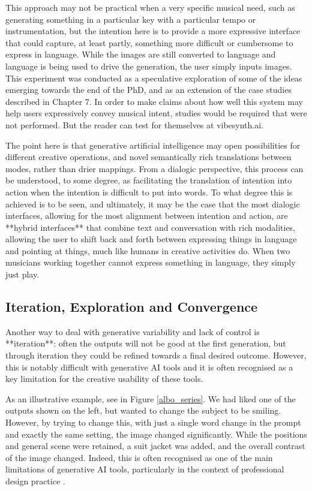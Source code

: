 This approach may not be practical when a very specific musical need, such as generating something in a particular key with a particular tempo or instrumentation, but the intention here is to provide a more expressive interface that could capture, at least partly, something more difficult or cumbersome to express in language. While the images are still converted to language and language is being used to drive the generation, the user simply inputs images. This experiment was conducted as a speculative exploration of some of the ideas emerging towards the end of the PhD, and as an extension of the case studies described in Chapter 7. In order to make claims about how well this system may help users expressively convey musical intent, studies would be required that were not performed. But the reader can test for themselves at vibesynth.ai.

The point here is that generative artificial intelligence may open possibilities for different creative operations, and novel semantically rich translations between modes, rather than drier mappings. From a dialogic perspective, this process can be understood, to some degree, as facilitating the translation of intention into action when the intention is difficult to put into words. To what degree this is achieved is to be seen, and ultimately, it may be the case that the most dialogic interfaces, allowing for the most alignment between intention and action, are **hybrid interfaces** that combine text and conversation with rich modalities, allowing the user to shift back and forth between expressing things in language and pointing at things, much like humans in creative activities do. When two musicians working together cannot express something in language, they simply just play.


\subsection{Iteration, Exploration and Convergence}

Another way to deal with generative variability and lack of control is **iteration**: often the outputs will not be good at the first generation, but through iteration they could be refined towards a final desired outcome. However, this is notably difficult with generative AI tools and it is often recognised as a key limitation for the creative usability of these tools.

As an illustrative example, see in Figure \ref{albo_series}. We had liked one of the outputs shown on the left, but wanted to change the subject to be smiling. However, by trying to change this, with just a single word change in the prompt and exactly the same setting, the image changed significantly. While the positions and general scene were retained, a suit jacket was added, and the overall contrast of the image changed. Indeed, this is often recognised as one of the main limitations of generative AI tools, particularly in the context of professional design practice \cite{Park2024-gw}.

